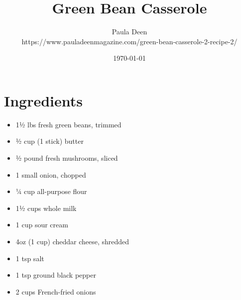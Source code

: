 \documentclass[11pt,letterpaper]{article}
\title{Green Bean Casserole}
\author{
  Paula Deen \\
  \small{ https://www.pauladeenmagazine.com/green-bean-casserole-2-recipe-2/ }
}
\date{\today}
\begin{document}
\maketitle

\section*{Ingredients}
\begin{multicols}{2}
    \begin{itemize}
        \item 1½ lbs fresh green beans, trimmed
        \item ½ cup (1 stick) butter
        \item ½ pound fresh mushrooms, sliced
        \item 1 small onion, chopped
        \item ¼ cup all-purpose flour
        \item 1½ cups whole milk
    \end{itemize}
    \columnbreak
    \begin{itemize}
        \item 1 cup sour cream
        \item 4oz (1 cup) cheddar cheese, shredded 
        \item 1 tsp salt
        \item 1 tsp ground black pepper
        \item 2 cups French-fried onions
    \end{itemize}
\end{multicols}
\end{document}
